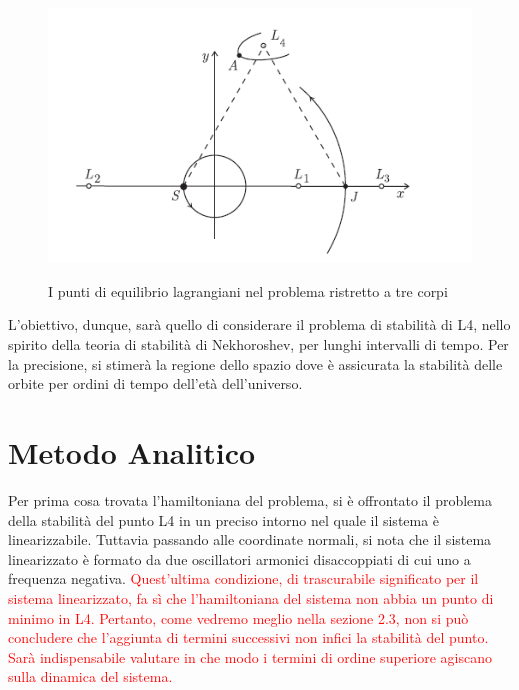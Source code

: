 \documentclass[a4paper,11pt,titlepage]{report}
\theoremstyle{definition}
\theoremstyle{plain}
\begin{document}
\begin{figure}[h]
	\centering
	\includegraphics[scale=0.8]{PuntiLagrangiani.png}
	\label{fig:Lagr}
	\caption{I punti di equilibrio lagrangiani nel problema ristretto a tre corpi}
\end{figure}
L'obiettivo, dunque, sarà quello di considerare il problema di stabilità di L4, nello spirito della teoria di stabilità di Nekhoroshev, per lunghi intervalli di tempo. Per la precisione, si stimerà la regione dello spazio dove è assicurata la stabilità delle orbite per ordini di tempo dell'età dell'universo.

\chapter{Metodo Analitico}
Per prima cosa trovata l'hamiltoniana del problema, si è offrontato il problema della stabilità del punto L4 in un preciso intorno nel quale il sistema è linearizzabile. Tuttavia passando alle coordinate normali, si nota che il sistema linearizzato è formato da due oscillatori armonici disaccoppiati di cui uno a frequenza negativa. \textcolor{red}{Quest'ultima condizione, di trascurabile significato per il sistema linearizzato, fa sì che l'hamiltoniana del sistema non abbia un punto di minimo in L4.
Pertanto, come vedremo meglio nella sezione 2.3, non si può concludere che l'aggiunta di termini successivi non infici la stabilità del punto.
Sarà indispensabile valutare in che modo i termini di ordine superiore agiscano sulla dinamica del sistema.}
\end{document}
